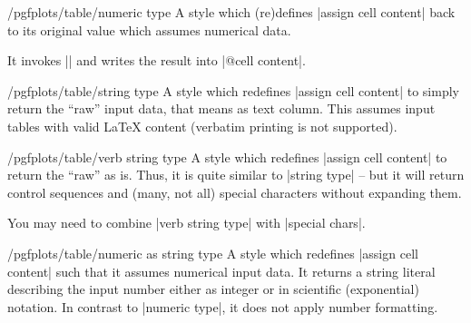 \begin{stylekey}{/pgfplots/table/numeric type}
    A style which (re)defines |assign cell content| back to its original value
    which assumes numerical data.

    It invokes |\pgfmathprintnumberto| and writes the result into
    |@cell content|.
\end{stylekey}

\begin{stylekey}{/pgfplots/table/string type}
    A style which redefines |assign cell content| to simply return the ``raw''
    input data, that means as text column. This assumes input tables with valid
    \LaTeX{} content (verbatim printing is not supported).
\end{stylekey}

\begin{stylekey}{/pgfplots/table/verb string type}
    A style which redefines |assign cell content| to return the ``raw'' as is.
    Thus, it is quite similar to |string type| -- but it will return control
    sequences and (many, not all) special characters without expanding them.

    You may need to combine |verb string type| with |special chars|.
\end{stylekey}

\begin{stylekey}{/pgfplots/table/numeric as string type}
    A style which redefines |assign cell content| such that it assumes
    numerical input data. It returns a string literal describing the input
    number either as integer or in scientific (exponential) notation. In
    contrast to |numeric type|, it does not apply number formatting.
\end{stylekey}

